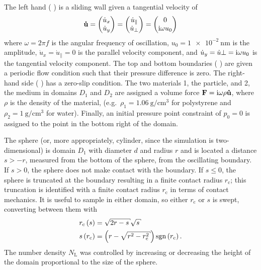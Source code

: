 The left hand (%
) %
is a sliding wall given a tangential velocity of
\begin{equation}
  \mathbf{\dot{u}} =
  \begin{pmatrix}
    \dot{u}_x \\
    \dot{u}_y
  \end{pmatrix}
  =
  \begin{pmatrix}
    \dot{u}_\parallel \\
    \dot{u}_\perp
  \end{pmatrix}
  =
  \begin{pmatrix}
    0 \\
    {\mathrm{i}}\omega u_0
  \end{pmatrix}
\end{equation}
where $\omega=2\pi f$ is the angular frequency of oscillation,
$u_0=\SI{1e-2}{\nano\meter}$ is the amplitude, $\dot{u}_x=\dot{u}_\parallel=0$
is the parallel velocity component, and
$\dot{u}_y=\dot{u}{\perp}={\mathrm{i}}\omega u_0$ is the tangential velocity
component.
The top and bottom
boundaries
(%
)%
are given a periodic flow condition such that their pressure difference
is zero.  The right-hand side (%
) %
has a zero-slip condition.  The two materials 1, the particle, and 2, the
medium in domains $D_1$ and $D_2$ are assigned a volume force $\mathbf{F}={\mathrm{i}} \omega \rho
  \mathbf{\dot{u}}$,
where $\rho$ is the density of the material, (e.g.\ $\rho_1 =
  \SI{1.06}{\gram\per\centi\meter\cubed}$ for polystyrene and $\rho_2 =
  \SI{1}{\gram\per\centi\meter\cubed}$ for water).  Finally, an initial pressure point
constraint of $p_0=0$ is assigned to the point in the bottom right of the
domain.

The sphere (or, more appropriately, cylinder, since the simulation is two-dimensional) is domain $D_1$ with diameter $d$ and radius $r$ and is
located a distance $s>-r$, measured from the bottom of the sphere, from the
oscillating boundary.  If $s>0$, the sphere does not make contact with the
boundary.  If $s\leq0$, the sphere is truncated at the boundary resulting
in a finite contact radius $r_\mathrm{c}$; this truncation is identified with
a finite contact radius $r_\mathrm{c}$ in terms of contact mechanics.
It is useful to sample in either domain, so
either $r_\mathrm{c}$ or $s$ is swept, converting between them with
\begin{align}
  r_\mathrm{c}\left(s\right) & = \sqrt{2r-s}\sqrt{s}                                                    \\
  s\left(r_\mathrm{c}\right) & = \left(r-\sqrt{r^2-r_\mathrm{c}^2}\right)\sgn\left(r_\mathrm{c}\right).
\end{align}
The number density $N_\mathrm{L}$ was controlled by increasing or
decreasing the height of the domain proportional to the size of the sphere.

